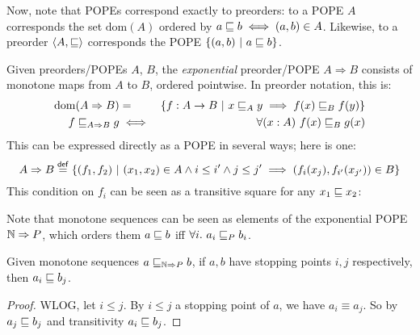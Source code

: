 \documentclass{article}
\newcommand{\dom}[1]{\mathrm{dom}(#1)}
\newcommand{\expope}[2]{#1 \Rightarrow #2}
\begin{document}
Now, note that POPEs correspond exactly to preorders: to a POPE $A$ corresponds
the set $\dom{A}$ ordered by $a \sqsubseteq b \iff (a,b) \in A$. Likewise, to a
preorder $\langle{A,\sqsubseteq}\rangle$ corresponds the POPE $\{{(a,b)}~|~{a \sqsubseteq b}\}$.

\begin{definition}
  Given preorders/POPEs $A$, $B$, the \emph{exponential} preorder/POPE
  $\expope{A}{B}$ consists of monotone maps from $A$ to $B$, ordered pointwise.
  In preorder notation, this is:
  \begin{eqnarray*}
    \dom{\expope{A}{B}} &=& \setfor{f : A \to B}
        {x \ale_A y \implies f(x) \ale_B f(y)}\\
    f \ale_{\expope{A}{B}} g &\iff& \forall(x : A)\ f(x) \ale_B g(x)
  \end{eqnarray*}
  This can be expressed directly as a POPE in several ways; here is one:
  \begin{equation*}
    \expope{A}{B} \defeq
    \setfor{(f_1,f_2)}
           {(x_1, x_2) \in A \wedge i \le i' \wedge j \le j'
             \implies (f_i(x_j), f_{i'}(x_{j'})) \in B}
  \end{equation*}
  This condition on $f_i$ can be seen as a transitive square for any $x_1 \sqsubseteq
  x_2$:
  \begin{center}
            {}
  \end{center}
\end{definition}

Note that monotone sequences can be seen as elements of the exponential POPE
$\expope{\N}{P}$, which orders them $a \sqsubseteq b$ iff $\forall i.\ a_i \sqsubseteq_P b_i$.

\begin{theorem}\label{thm:stopping-points-le}
  Given monotone sequences $a \ale_{\expope{\N}{P}} b$, if $a,b$ have stopping
  points $i,j$ respectively, then $a_i \sqsubseteq b_j$.
\end{theorem}
\begin{proof}
  WLOG, let $i \le j$. By $i \le j$ a stopping point of $a$, we have
  $a_i \equiv a_j$. So by $a_j \sqsubseteq b_j$ and transitivity $a_i \sqsubseteq b_j$.
\end{proof}
\end{document}
